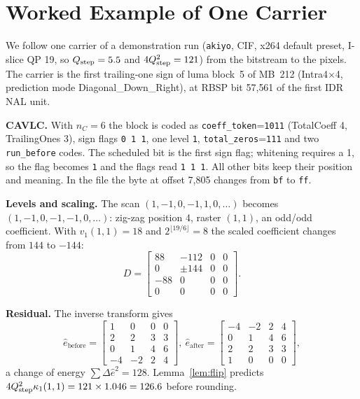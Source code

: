\section{Worked Example of One Carrier}
\label{app:example}

We follow one carrier of a demonstration run (\texttt{akiyo}, CIF, x264 default preset, I-slice QP 19, so $Q_{\mathrm{step}}=5.5$ and $4Q_{\mathrm{step}}^2=121$) from the bitstream to the pixels. The carrier is the first trailing-one sign of luma block~5 of MB~212 (Intra4$\times$4, prediction mode Diagonal\_Down\_Right), at RBSP bit 57{,}561 of the first IDR NAL unit.

\textbf{CAVLC.} With $n_C=6$ the block is coded as \texttt{coeff\_token}=\texttt{1011} (TotalCoeff 4, TrailingOnes 3), sign flags \texttt{0\,1\,1}, one level \texttt{1}, \texttt{total\_zeros}=\texttt{111} and two \texttt{run\_before} codes. The scheduled bit is the first sign flag; whitening requires a 1, so the flag becomes \texttt{1} and the flags read \texttt{1\,1\,1}. All other bits keep their position and meaning. In the file the byte at offset 7{,}805 changes from \texttt{bf} to \texttt{ff}.

\textbf{Levels and scaling.} The scan $(1,-1,0,-1,1,0,\dots)$ becomes $(1,-1,0,-1,-1,0,\dots)$: zig-zag position 4, raster $(1,1)$, an odd/odd coefficient. With $v_{1}(1,1)=18$ and $2^{\lfloor19/6\rfloor}=8$ the scaled coefficient changes from $144$ to $-144$:
\begin{equation*}
D=\begin{bmatrix}88&-112&0&0\\0&\pm144&0&0\\-88&0&0&0\\0&0&0&0\end{bmatrix}.
\end{equation*}

\textbf{Residual.} The inverse transform gives
\begin{equation*}
\hat e_{\mathrm{before}}=\begin{bmatrix}1&0&0&0\\2&2&3&3\\0&1&4&6\\-4&-2&2&4\end{bmatrix},\
\hat e_{\mathrm{after}}=\begin{bmatrix}-4&-2&2&4\\0&1&4&6\\2&2&3&3\\1&0&0&0\end{bmatrix},
\end{equation*}
a change of energy $\sum\Delta\hat e^2=128$. Lemma~\ref{lem:flip} predicts $4Q_{\mathrm{step}}^2\kappa_1(1,1)=121\times1.046=126.6$ before rounding.

